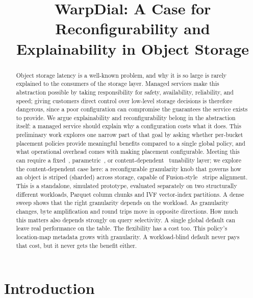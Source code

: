 \documentclass[10pt,conference]{IEEEtran}
\begin{document}
\title{WarpDial: A Case for Reconfigurability and Explainability in Object Storage}

\author{
}

\maketitle

\begin{abstract}
Object storage latency is a well-known problem, and why it is so large is
rarely explained to the consumers of the storage layer. Managed
services make this abstraction possible by taking responsibility for safety,
availability, reliability, and speed; giving customers direct control over
low-level storage decisions is therefore dangerous, since a poor
configuration can compromise the guarantees the service exists to provide.
We argue explainability and reconfigurability belong in the abstraction
itself: a managed service should explain why a configuration costs what it
does. This preliminary work explores one narrow part of that goal by asking
whether per-bucket placement policies provide meaningful benefits compared
to a single global policy, and what operational overhead comes with making
placement configurable. Meeting this can require a fixed~\cite{crush2006},
parametric~\cite{mapx2020}, or content-dependent~\cite{fusion2025}
tunability layer; we explore the content-dependent case here: a
reconfigurable granularity knob that governs how an object is striped
(sharded) across storage, capable of Fusion-style~\cite{fusion2025} stripe
alignment. This is a standalone, simulated prototype, evaluated separately
on two structurally different workloads, Parquet column chunks and IVF
vector-index partitions. A dense sweep shows that the right granularity
depends on the workload. As granularity changes, byte amplification and
round trips move in opposite directions. How much this matters also
depends strongly on query selectivity. A single global default can leave
real performance on the table. The flexibility has a cost too. This
policy's location-map metadata grows with granularity. A workload-blind
default never pays that cost, but it never gets the benefit either.
\end{abstract}

\section{Introduction}
\end{document}
